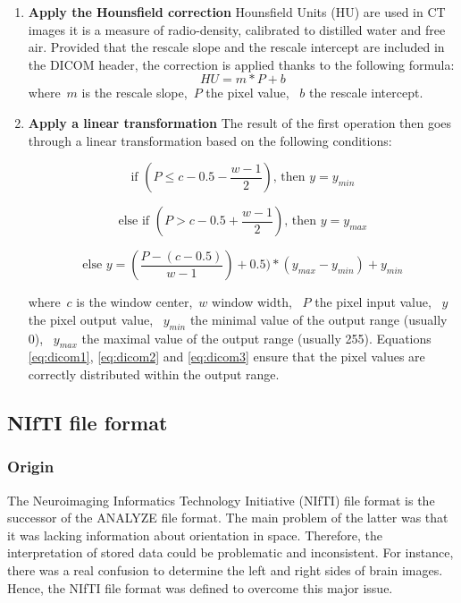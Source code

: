 \begin{enumerate}
	\item \textbf{Apply the Hounsfield correction}\newline
	Hounsfield Units (HU) are used in CT images it is a measure of radio-density, calibrated to distilled water and free air. Provided that the rescale slope and the rescale intercept are included in the DICOM header, the correction is applied thanks to the following formula:
\begin{equation}
	HU = m * P + b
\end{equation}
	where~$m$ is the rescale slope,~$P$ the pixel value, ~$b$ the rescale intercept.

	\item \textbf{Apply a linear transformation}\newline
	The result of the first operation then goes through a linear transformation based on the following conditions: 

\begin{equation}\label{eq:dicom1}
\textrm{if } (P \leq c - 0.5 - \frac{w-1}{2}) \textrm{, then }y = y_{min}
\end{equation}

\begin{equation}\label{eq:dicom2}
\textrm{else if } (P > c - 0.5 + \frac{w-1}{2}) \textrm{, then }y = y_{max}
\end{equation}

\begin{equation}\label{eq:dicom3}
\textrm{else } y = (\frac{P - (c - 0.5)}{w-1}) + 0.5) * (y_{max} - y_{min}) + y_{min}
\end{equation}

where~$c$ is the window center,~$w$ window width, ~$P$ the pixel input value, ~$y$ the pixel output value, ~$y_{min}$ the minimal value of the output range (usually 0), ~$y_{max}$ the maximal value of the output range (usually 255). Equations \ref{eq:dicom1}, \ref{eq:dicom2} and \ref{eq:dicom3} ensure that the pixel values are correctly distributed within the output range. 

\end{enumerate}


\subsection{NIfTI file format}

\subsubsection{Origin}
The Neuroimaging Informatics Technology Initiative (NIfTI) file format is the successor of the ANALYZE file format. The main problem of the latter was that it was lacking information about orientation in space. Therefore, the interpretation of stored data could be problematic and inconsistent. For instance, there was a real confusion to determine the left and right sides of brain images. Hence, the NIfTI file format was defined to overcome this major issue.


